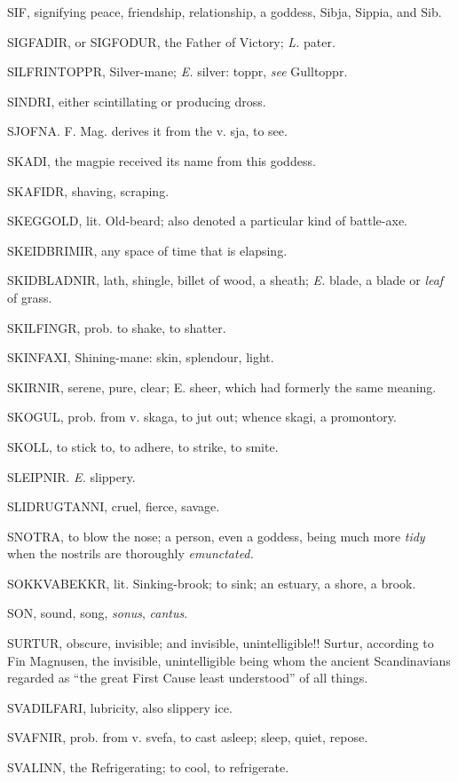 SIF, signifying peace, friendship, relationship, a goddess, Sibja,
Sippia, and Sib.

SIGFADIR, or SIGFODUR, the Father of Victory; \emph{L.} pater.

SILFRINTOPPR, Silver-mane; \emph{E.} silver: toppr, \emph{see} Gulltoppr.

SINDRI, either scintillating or producing dross.

SJOFNA. F. Mag. derives it from the v. sja, to see.

SKADI, the magpie received its name from this goddess.

SKAFIDR, shaving, scraping.

SKEGGOLD, lit. Old-beard; also denoted a particular kind of
battle-axe.

SKEIDBRIMIR, any space of time that is elapsing.

SKIDBLADNIR, lath, shingle, billet of wood, a sheath; \emph{E.} blade, a
blade or \emph{leaf} of grass.

SKILFINGR, prob. to shake, to shatter.

SKINFAXI, Shining-mane: skin, splendour, light.

SKIRNIR, serene, pure, clear; E. sheer, which had formerly the same
meaning.

SKOGUL, prob. from v. skaga, to jut out; whence skagi, a promontory.

SKOLL, to stick to, to adhere, to strike, to smite.

SLEIPNIR. \emph{E.} slippery.

SLIDRUGTANNI, cruel, fierce, savage.

SNOTRA, to blow the nose; a person, even a goddess, being much more
\emph{tidy} when the nostrils are thoroughly \emph{emunctated.}

SOKKVABEKKR, lit. Sinking-brook; to sink; an estuary, a shore, a
brook.

SON, sound, song, \emph{sonus}, \emph{cantus}.

SURTUR, obscure, invisible; and invisible, unintelligible!! Surtur,
according to Fin Magnusen, the invisible, unintelligible being whom
the ancient Scandinavians regarded as ``the great First Cause least
understood'' of all things.

SVADILFARI, lubricity, also slippery ice.

SVAFNIR, prob. from v. svefa, to cast asleep; sleep, quiet, repose.

SVALINN, the Refrigerating; to cool, to refrigerate.

